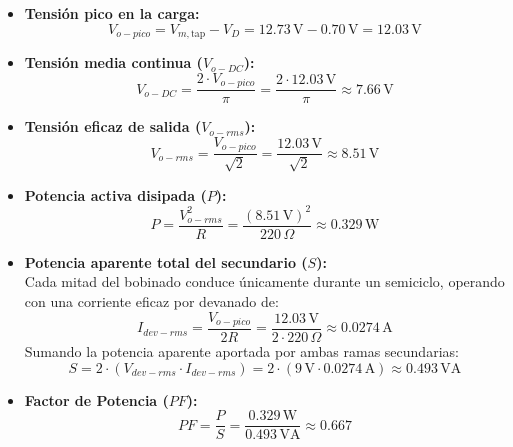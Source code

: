 \begin{itemize}
    \item \textbf{Tensión pico en la carga:}
    \begin{equation}
        V_{o-pico} = V_{m,\mathrm{tap}} - V_D = 12.73\,\mathrm{V} - 0.70\,\mathrm{V} = \mathbf{12.03\,\mathrm{V}}
    \end{equation}
    \item \textbf{Tensión media continua ($V_{o-DC}$):}
    \begin{equation}
        V_{o-DC} = \frac{2 \cdot V_{o-pico}}{\pi} = \frac{2 \cdot 12.03\,\mathrm{V}}{\pi} \approx \mathbf{7.66\,\mathrm{V}}
    \end{equation}
    \item \textbf{Tensión eficaz de salida ($V_{o-rms}$):}
    \begin{equation}
        V_{o-rms} = \frac{V_{o-pico}}{\sqrt{2}} = \frac{12.03\,\mathrm{V}}{\sqrt{2}} \approx \mathbf{8.51\,\mathrm{V}}
    \end{equation}
    \item \textbf{Potencia activa disipada ($P$):}
    \begin{equation}
        P = \frac{V_{o-rms}^2}{R} = \frac{(8.51\,\mathrm{V})^2}{220\,\Omega} \approx \mathbf{0.329\,\mathrm{W}}
    \end{equation}
    \item \textbf{Potencia aparente total del secundario ($S$):}\\
    Cada mitad del bobinado conduce únicamente durante un semiciclo, operando con una corriente eficaz por devanado de:
    \begin{equation}
        I_{dev-rms} = \frac{V_{o-pico}}{2R} = \frac{12.03\,\mathrm{V}}{2 \cdot 220\,\Omega} \approx 0.0274\,\mathrm{A}
    \end{equation}
    Sumando la potencia aparente aportada por ambas ramas secundarias:
    \begin{equation}
        S = 2 \cdot (V_{dev-rms} \cdot I_{dev-rms}) = 2 \cdot (9\,\mathrm{V} \cdot 0.0274\,\mathrm{A}) \approx \mathbf{0.493\,\mathrm{VA}}
    \end{equation}
    \item \textbf{Factor de Potencia ($PF$):}
    \begin{equation}
        PF = \frac{P}{S} = \frac{0.329\,\mathrm{W}}{0.493\,\mathrm{VA}} \approx \mathbf{0.667}
    \end{equation}
\end{itemize}

